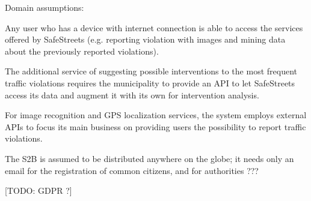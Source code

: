 Domain assumptions:
\begin{enumerate}[label={D\arabic*.}]
	 \label{D_email}
     \label{D_reports}
     \label{D_occurrency}
     \label{D_mun_availability}
   	 \label{D_mun_accuracy}
     \label{D_supervisor}
     \label{D_gps}
     \label{D_internet}
     \label{D_city_auth}
     \label{D_pce}
     \label{D_pce_api}
\end{enumerate}

Any user who has a device with internet connection is able to access the services offered by SafeStreets (e.g. reporting violation with images and mining data about the previously reported violations).

The additional service of suggesting possible interventions to the most frequent traffic violations requires the municipality to provide an API to let SafeStreets access its data and augment it with its own for intervention analysis.

For image recognition and GPS localization services, the system employs external APIs to focus its main business on providing users the possibility to report traffic violations.

The S2B is assumed to be distributed anywhere on the globe; it needs only an email for the registration of common citizens, and for authorities ???

[TODO: GDPR ?]